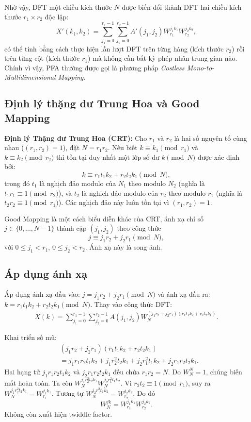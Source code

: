 Nhờ vậy, DFT một chiều kích thước $N$ được biến đổi thành DFT hai chiều kích thước $r_1 \times r_2$ độc lập:
\begin{equation}
X'(k_1,k_2) = \sum_{j_1=0}^{r_1-1} \sum_{j_2=0}^{r_2-1} A'(j_1,j_2) W_{r_1}^{j_1 k_1} W_{r_2}^{j_2 k_2},
\end{equation}
có thể tính bằng cách thực hiện lần lượt DFT trên từng hàng (kích thước $r_2$) rồi trên từng cột (kích thước $r_1$) mà không cần bất kỳ phép nhân trung gian nào. Chính vì vậy, PFA thường được gọi là phương pháp \textit{Costless Mono-to-Multidimensional Mapping}.

\subsection{Định lý thặng dư Trung Hoa và Good Mapping}

\textbf{Định lý Thặng dư Trung Hoa (CRT):} 
Cho $r_1$ và $r_2$ là hai số nguyên tố cùng nhau ($(r_1, r_2) = 1$), đặt $N = r_1 r_2$. 
Nếu biết $k \equiv k_1 \pmod{r_1}$ và $k \equiv k_2 \pmod{r_2}$ thì tồn tại duy nhất 
một lớp số dư $k \pmod{N}$ được xác định bởi:
\[
k \equiv r_1 t_1 k_2 + r_2 t_2 k_1 \pmod{N},
\]
trong đó $t_1$ là nghịch đảo modulo của $N_1$ theo modulo $N_2$ 
(nghĩa là $t_1 r_1 \equiv 1 \pmod{r_2}$), và $t_2$ là nghịch đảo modulo của $r_2$ 
theo modulo $r_1$ (nghĩa là $t_2 r_2 \equiv 1 \pmod{r_1}$). 
Các nghịch đảo này luôn tồn tại vì $(r_1, r_2) = 1$.

Good Mapping là một cách biểu diễn khác của CRT, ánh xạ chỉ số \(j \in \{0, \dots, N-1\}\) thành cặp \((j_1, j_2)\) theo công thức
\[
j \equiv j_1 r_2 + j_2 r_1 \pmod{N},
\]
với \(0 \le j_1 < r_1\), \(0 \le j_2 < r_2\). Ánh xạ này là song ánh.

\subsection{Áp dụng ánh xạ}

Áp dụng ánh xạ đầu vào: $j = j_1 r_2 + j_2 r_1 \pmod N$ và ánh xạ đầu ra: $k = r_1 t_1 k_2 + r_2 t_2 k_1 \pmod N$. Thay vào công thức DFT:
\begin{align}
X(k) = \sum_{j_1=0}^{r_1-1} \sum_{j_2=0}^{r_2-1} A(j_1,j_2) W_N^{(j_1 r_2 + j_2 r_1)(r_1 t_1 k_2 + r_2 t_2 k_1)}.
\end{align}

Khai triển số mũ:
\begin{align}
&(j_1 r_2 + j_2 r_1)(r_1 t_1 k_2 + r_2 t_2 k_1) \\
&= j_1 r_1 r_2 t_1 k_2 + j_1 r_2^2 t_2 k_1 + j_2 r_1^2 t_1 k_2 + j_2 r_1 r_2 t_2 k_1.
\end{align}
Hai hạng tử $j_1 r_1 r_2 t_1 k_2$ và $j_2 r_1 r_2 t_2 k_1$ đều chứa $r_1 r_2 = N$. Do $W_N^N = 1$, chúng biến mất hoàn toàn. Ta còn $W_N^{j_1 r_2^2 t_2 k_1} W_N^{j_2 r_1^2 t_1 k_2}$. Vì $r_2 t_2 \equiv 1 \pmod{r_1}$, suy ra $W_N^{j_1 r_2^2 t_2 k_1} = W_{r_1}^{j_1 k_1}$. Tương tự $W_N^{j_2 r_1^2 t_1 k_2} = W_{r_2}^{j_2 k_2}$. Do đó
\begin{equation}
W_N^{jk} = W_{r_1}^{j_1 k_1} W_{r_2}^{j_2 k_2}.
\end{equation}
Không còn xuất hiện twiddle factor.

